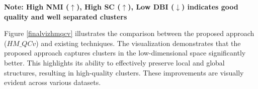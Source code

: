 \begin{table}[!htbp]

 \caption{Comparisons of existing NLDR techniques with proposed method on large datasets}
    \centering
   \tiny{\textbf{Note: High NMI ($\uparrow$), High SC ($\uparrow$), Low DBI ($\downarrow$) indicates good quality and well separated clusters}}
    \label{metriclarge}
\end{table}


Figure \ref{finalvizhmqcv} illustrates the comparison between the proposed approach ($HM\_QCv$) and existing techniques. The visualization demonstrates that the proposed approach captures clusters in the low-dimensional space significantly better. This highlights its ability to effectively preserve local and global structures, resulting in high-quality clusters. These improvements are visually evident across various datasets.

